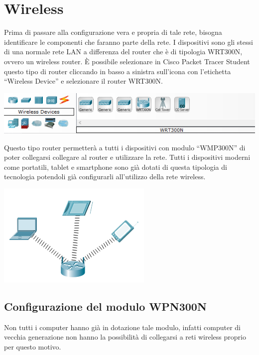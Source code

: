 \section{Wireless}

Prima di passare alla configurazione vera e propria di tale rete, bisogna identificare le componenti che faranno parte della rete. I dispositivi sono gli stessi di una normale rete LAN a differenza del router che è di tipologia WRT300N, ovvero un wireless router. È possibile selezionare in Cisco Packet Tracer Student questo tipo di router cliccando in basso a sinistra sull’icona con l’etichetta “Wireless Device” e selezionare il router WRT300N.

\begin{center}
    \includegraphics[width=\linewidth]{images/08.wireless/01.png}
\end{center}

Questo tipo router permetterà a tutti i dispositivi con modulo “WMP300N” di poter collegarsi collegare al router e utilizzare la rete. Tutti i dispositivi moderni come portatili, tablet e smartphone sono già dotati di questa tipologia di tecnologia potendoli già configurarli all’utilizzo della rete wireless.

\begin{center}
    \includegraphics[width=0.4\linewidth]{images/08.wireless/02.png}
\end{center}

\subsection{Configurazione del modulo WPN300N}

Non tutti i computer hanno già in dotazione tale modulo, infatti computer di vecchia generazione non hanno la possibilità di collegarsi a reti wireless proprio per questo motivo. 

